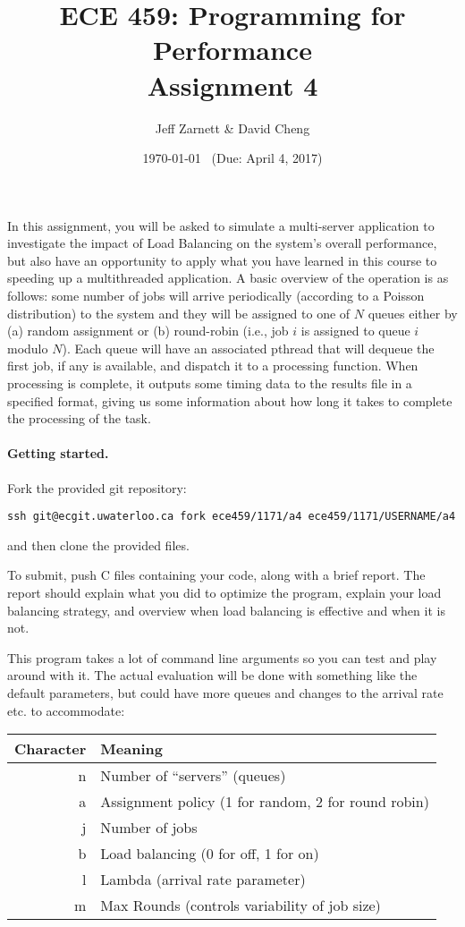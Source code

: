 \documentclass[letterpaper,10pt]{article}
\title{\bf ECE 459: Programming for Performance\\Assignment 4}
\author{Jeff Zarnett \& David Cheng}
\date{\today ~ (Due: April 4, 2017)}
\begin{document}
\maketitle

In this assignment, you will be asked to simulate a multi-server application to investigate the impact of Load Balancing on the system's overall performance, but also have an opportunity to apply what you have learned in this course to speeding up a multithreaded application. A basic overview of the operation is as follows: some number of jobs will arrive periodically (according to a Poisson distribution) to the system and they will be assigned to one of $N$ queues either by (a) random assignment or (b) round-robin (i.e., job $i$ is assigned to queue $i$ modulo $N$). Each queue will have an associated pthread that will dequeue the first job, if any is available, and dispatch it to a processing function. When processing is complete, it outputs some timing data to the results file in a specified format, giving us some information about how long it takes to complete the processing of the task.


\paragraph{Getting started.} Fork the provided git repository:
\begin{center}
{\tt ssh git@ecgit.uwaterloo.ca fork ece459/1171/a4 ece459/1171/USERNAME/a4}
\end{center}
\noindent and then clone the provided files.

To submit, push C files containing your code, along with a brief report. The report should explain what you did to optimize the program, explain your load balancing strategy, and overview when load balancing is effective and when it is not.

This program takes a lot of command line arguments so you can test and play around with it. The actual evaluation will be done with something like the default parameters, but could have more queues and changes to the arrival rate etc. to accommodate:

\begin{center}
	\begin{tabular}{r|l}
	\textbf{Character} & \textbf{Meaning} \\ \hline
	n & Number of ``servers'' (queues) \\
	a & Assignment policy (1 for random, 2 for round robin) \\
	j & Number of jobs \\
	b & Load balancing (0 for off, 1 for on) \\
	l & Lambda (arrival rate parameter) \\
	m & Max Rounds (controls variability of job size) \\
	\end{tabular}
\end{center}
\end{document}
